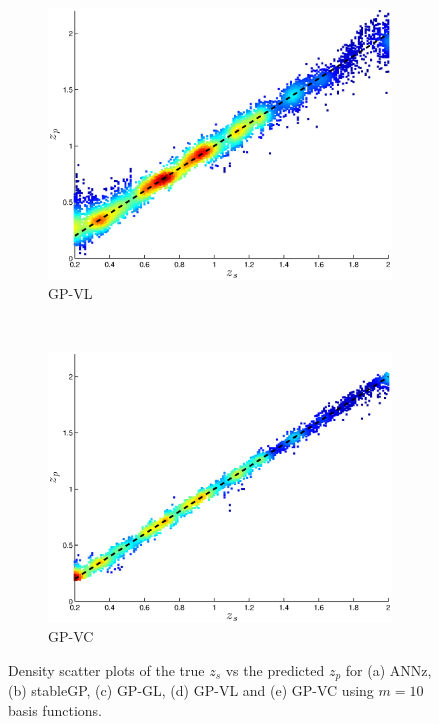\documentclass[useAMS,usenatbib,fleqn]{mn2e}
\begin{document}
\begin{figure}
        \begin{subfigure}[b]{0.3\textwidth}
               \includegraphics[width=\textwidth]{figures/GPVL.eps}
                \caption{GP-VL}
        \end{subfigure}
        ~
        \begin{subfigure}[b]{0.3\textwidth}
                \includegraphics[width=\textwidth]{figures/GPVC.eps}
                \caption{GP-VC}
        \end{subfigure}
        
        \caption{Density scatter plots of the true $z_{s}$ vs the predicted $z_{p}$ for (a) ANNz, (b) stableGP, (c) GP-GL, (d) GP-VL and (e) GP-VC using $m=10$ basis functions.}
        \label{fig-experiment-1}
\end{figure}
\end{document}
